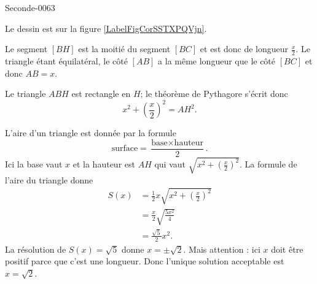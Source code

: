 
\begin{corrige}{Seconde-0063}

Le dessin est sur la figure \ref{LabelFigCorSSTXPQVjn}. %
\newcommand{\CaptionFigCorSSTXPQVjn}{Le triangle équilatéral de l'exercice \ref{exoSeconde-0063}.}


Le segment \( [BH]\) est la moitié du segment \( [BC]\) et est donc de longueur \( \frac{ x }{2}\). Le triangle étant équilatéral, le côté \( [AB]\) a la même longueur que le côté \( [BC]\) et donc \( AB=x\).

Le triangle \( ABH\) est rectangle en \( H\); le théorème de Pythagore s'écrit donc
\begin{equation}
    x^2+\left( \frac{ x }{2} \right)^2=AH^2.
\end{equation}

L'aire d'un triangle est donnée par la formule
\begin{equation}
    \text{surface}=\frac{ \text{base}\times\text{hauteur} }{ 2 }.
\end{equation}
Ici la base vaut \( x\) et la hauteur est \( AH\) qui vaut \( \sqrt{x^2+\left( \frac{ x }{2} \right)^2}\). La formule de l'aire du triangle donne
\begin{subequations}
    \begin{align}
        S(x)&=\frac{ 1 }{2}x\sqrt{x^2+\left( \frac{ x }{2} \right)^2}\\
        &=\frac{ x }{2}\sqrt{\frac{ 5x^2 }{ 4 }}\\
        &=\frac{ \sqrt{5} }{ 2 }x^2.
    \end{align}
\end{subequations}
La résolution de \( S(x)=\sqrt{5}\) donne \( x=\pm\sqrt{2}\). Mais attention : ici \( x\) doit être positif parce que c'est une longueur. Donc l'unique solution acceptable est \( x=\sqrt{2}\).

\end{corrige}

